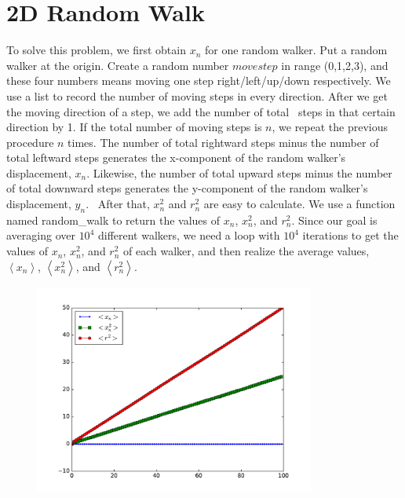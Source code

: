 \documentclass{article}
\begin{document}
\section{2D Random Walk}
To solve this problem, we first obtain $x_{n}$ for one random walker. Put a
random walker at the origin. Create a random number $movestep$ in range
(0,1,2,3), and these four numbers means moving one step right/left/up/down
respectively. We use a list to record the number of moving steps in every
direction. After we get the moving direction of a step, we add the number of
total \ steps in that certain direction by 1. If the total number of moving
steps is $n$, we repeat the previous procedure $n$ times. The number of
total rightward steps minus the number of total leftward steps generates the
x-component of the random walker's displacement, $x_{n}$. Likewise, the
number of total upward steps minus the number of total downward steps
generates the y-component of the random walker's displacement, $y_{n}$. \
After that,  $x_{n}^{2}$ and $r_{n}^{2}$ are easy to calculate. We use a
function named random\_walk to return the values of $x_{n}$,  $x_{n}^{2}$,
and $r_{n}^{2}$. Since our goal is averaging over $10^{4}$ different
walkers, we need a loop with $10^{4}$ iterations to get the values of $%
x_{n}$, $x_{n}^{2}$, and $r_{n}^{2}$ of each walker, and then realize the
average values, $\left\langle x_{n}\right\rangle $, $\left\langle
x_{n}^{2}\right\rangle $, and $\left\langle r_{n}^{2}\right\rangle $. 
\begin{figure}[!ht]
	\centering
	\includegraphics[width=0.82\textwidth, clip]{RandomWalk.pdf}
	\caption{}
\end{figure}
\end{document}
